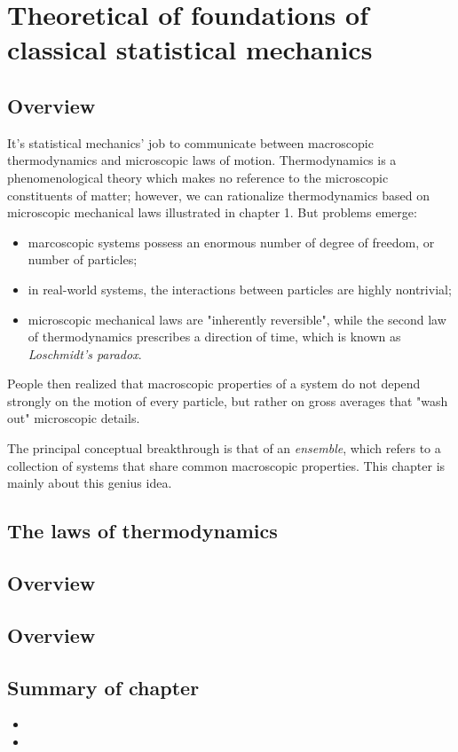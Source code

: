 \chapter{Theoretical of foundations of classical statistical mechanics}

\section{Overview}

It's statistical mechanics' job to communicate between macroscopic thermodynamics and microscopic laws of motion. Thermodynamics is a phenomenological theory which makes no reference to the microscopic constituents of matter; however, we can rationalize thermodynamics based on microscopic mechanical laws illustrated in chapter 1. But problems emerge:
\begin{itemize}
	\item marcoscopic systems possess an enormous number of degree of freedom, or number of particles;
	\item in real-world systems, the interactions between particles are highly nontrivial;
	\item microscopic mechanical laws are "inherently reversible", while the second law of thermodynamics prescribes a direction of time, which is known as \textit{Loschmidt's paradox}.
\end{itemize}
People then realized that macroscopic properties of a system do not depend strongly on the motion of every particle, but rather on gross averages that "wash out" microscopic details. 

The principal conceptual breakthrough is that of an \textit{ensemble}, which refers to a collection of systems that share common macroscopic properties. This chapter is mainly about this genius idea.

\section{The laws of thermodynamics}



\section{Overview}



\section{Overview}


\section*{Summary of chapter}

\begin{itemize}
	\item 
	\item 
\end{itemize}